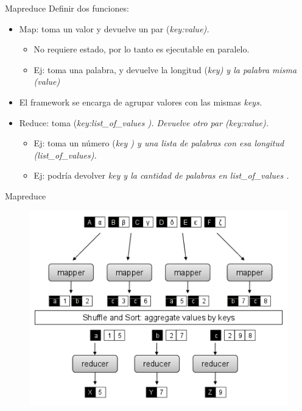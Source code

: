 \documentclass[xcolor=x11names,compress]{beamer}
\renewcommand{\(}{\begin{columns}}
\renewcommand{\)}{\end{columns}}
\newcommand{\<}[1]{\begin{column}{#1}}
\renewcommand{\>}{\end{column}}
\begin{document}
\begin{frame}{Mapreduce}
Definir dos funciones:
\begin{itemize}
\item Map: toma un valor y devuelve un par (\em key:value\em).
\begin{itemize}
\item No requiere estado, por lo tanto es ejecutable en paralelo.
\item Ej: toma una palabra, y devuelve la longitud (\em key\em) y la palabra misma (\em value\em)
\end{itemize}
\item El framework se encarga de agrupar valores con las mismas \em keys\em.
\item Reduce: toma (\em key:list\_of\_values \em). Devuelve otro par (\em key:value\em).
\begin{itemize}
\item Ej: toma un número (\em key \em) y una lista de palabras con esa longitud (\em list\_of\_values\em).
\item Ej: podría devolver \em key \em y la cantidad de palabras en \em list\_of\_values \em.
\end{itemize}
\end{itemize}
\end{frame}


\begin{frame}{Mapreduce}
\begin{figure}
\centering
\includegraphics[scale=0.5, keepaspectratio=True, natwidth=800,natheight=600]{mapreduce.png}
\end{figure}
\end{frame}
\end{document}
